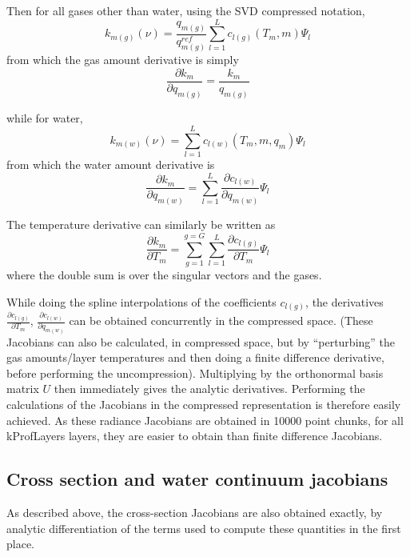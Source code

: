 \documentclass[12pt]{article}
\begin{document}
{{{{Then for all gases other than water, using the SVD compressed notation,
\begin{equation}
k_{m(g)}(\nu) = \frac{q_{m(g)}}{q^{ref}_{m(g)}}
                \sum_{l=1}^{L} c_{l(g)}(T_{m},m) \Psi_{l}
\end{equation}
from which the gas amount derivative is simply 
\begin{equation}
\frac{\partial k_{m}}{\partial q_{m(g)}} = \frac{k_{m}}{q_{m(g)}}
\end{equation}

while for water, 
\begin{equation}
k_{m(w)}(\nu) = \sum_{l=1}^{L} c_{l(w)}(T_{m},m,q_{m}) \Psi_{l}
\end{equation}
from which the water amount derivative is 
\begin{equation}
\frac{\partial k_{m}}{\partial q_{m(w)}} = 
\sum_{l=1}^{L} \frac{\partial c_{l(w)}}{\partial q_{m(w)}} \Psi_{l}
\end{equation}

The temperature derivative can similarly be written as
\begin{equation}
\frac{\partial k_{m}}{\partial T_{m}} = 
\sum_{g=1}^{g=G} \sum_{l=1}^{L} 
\frac{\partial c_{l(g)}}{\partial T_{m}} \Psi_{l}
\end{equation}
where the double sum is over the singular vectors and the gases.

While doing the spline interpolations of the coefficients $c_{l(g)}$,
the derivatives $\frac{\partial c_{l(g)}}{\partial T_{m}}$,
$\frac{\partial c_{l(w)}}{\partial q_{m(w)}}$ can be obtained
concurrently \cite{wil:89} in the compressed space.   (These
Jacobians can also be calculated, in compressed space, but by
``perturbing'' the gas amounts/layer temperatures and then doing a
finite difference derivative, before performing the uncompression).
Multiplying by the orthonormal basis matrix $U$ then immediately gives
the analytic derivatives.   Performing the calculations of the
Jacobians in the compressed representation is therefore easily
achieved.  As these radiance Jacobians are obtained in 10000 point chunks,
for all kProfLayers layers, they are easier to obtain than finite difference
Jacobians.  

\subsection{Cross section and water continuum jacobians}
As described above, the cross-section Jacobians are also obtained exactly, by 
analytic differentiation of the terms used to compute these quantities in the 
first place.

}}}}
\end{document}
